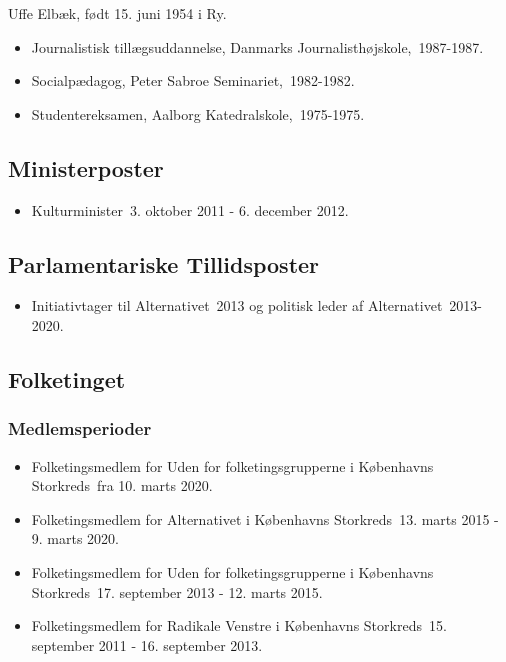 \documentclass[11pt, a4paper]{awesome-cv}
\begin{document}
\makecvheader[R]
\makelettertitle
\begin{cvletter}
Uffe Elbæk, født 15. juni 1954 i Ry.

\begin{itemize}
\item Journalistisk tillægsuddannelse, Danmarks Journalisthøjskole, 1987-1987.
\item Socialpædagog, Peter Sabroe Seminariet, 1982-1982.
\item Studentereksamen, Aalborg Katedralskole, 1975-1975.
\end{itemize}
\subsection*{Ministerposter}
\begin{itemize}
\item Kulturminister 3. oktober 2011 - 6. december 2012.
\end{itemize}
\subsection*{Parlamentariske Tillidsposter}
\begin{itemize}
\item Initiativtager til Alternativet 2013 og politisk leder af Alternativet 2013-2020.
\end{itemize}
\subsection*{Folketinget}
\subsubsection*{Medlemsperioder}
\begin{itemize}
\item Folketingsmedlem for Uden for folketingsgrupperne i Københavns Storkreds fra 10. marts 2020.
\item Folketingsmedlem for Alternativet i Københavns Storkreds 13. marts 2015 - 9. marts 2020.
\item Folketingsmedlem for Uden for folketingsgrupperne i Københavns Storkreds 17. september 2013 - 12. marts 2015.
\item Folketingsmedlem for Radikale Venstre i Københavns Storkreds 15. september 2011 - 16. september 2013.
\end{itemize}

\end{cvletter}
\end{document}
